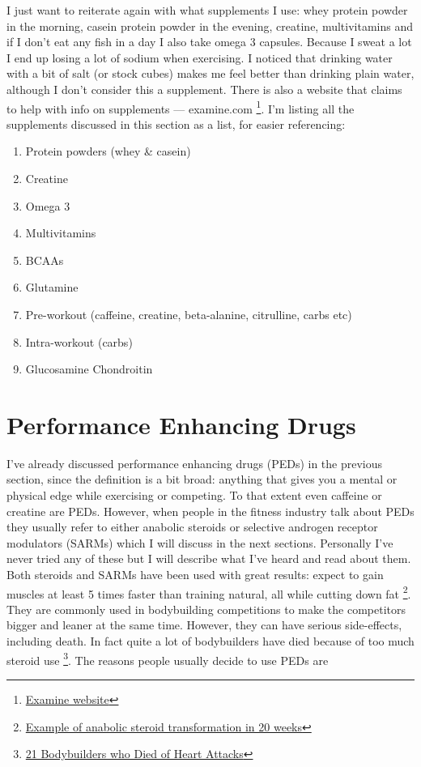 \documentclass[openany, 12pt]{book}
\begin{document}
        I just want to reiterate again with what supplements I use: whey protein powder in the morning, casein protein powder in the evening, creatine, multivitamins and if I don't eat any fish
        in a day I also take omega 3 capsules. Because I sweat a lot I end up
        losing a lot of sodium when exercising. I noticed that drinking water with a bit of salt (or stock cubes) makes me feel better
        than drinking plain water, although I don't consider this a supplement. There is also a website that claims to help with info on supplements --- examine.com
        \footnote{\href{https://examine.com/}{Examine website}}.
        I'm listing all the supplements discussed in this section as a list, for easier referencing:

	\begin{enumerate}
		\item Protein powders (whey \& casein)
		\item Creatine
		\item Omega 3
		\item Multivitamins
		\item BCAAs
		\item Glutamine
		\item Pre-workout (caffeine, creatine, beta-alanine, citrulline, carbs etc)
		\item Intra-workout (carbs)
		\item Glucosamine Chondroitin
	\end{enumerate}

        \section{Performance Enhancing Drugs}

        I've already discussed performance enhancing drugs (PEDs) in the previous section, since the definition is a bit broad: anything that gives you a mental or physical edge while exercising or
        competing. To that extent even caffeine or creatine are PEDs. However, when people in the fitness industry talk about PEDs they usually refer to either anabolic steroids or selective androgen
        receptor modulators (SARMs) which I will discuss in the next sections. Personally I've never tried any of these but I will describe what I've heard and read about them.
        Both steroids and SARMs have been used with great results: expect to gain muscles at least 5 times faster than training natural, all while cutting down fat
        \footnote{\href{https://www.reddit.com/r/nattyorjuice/comments/c0mak1/physique_before_usage_of_the_steroids_is/}{Example of anabolic steroid transformation in 20 weeks}}.
        They are commonly used in bodybuilding competitions to make the competitors bigger and leaner at the same time. However, they can have serious side-effects, including death. In fact quite a lot
        of bodybuilders have died because of too much steroid use
        \footnote{\href{https://fitnessvolt.com/bodybuilder-deaths-heart-attack/}{21 Bodybuilders who Died of Heart Attacks}}.
        The reasons people usually decide to use PEDs are
\end{document}
